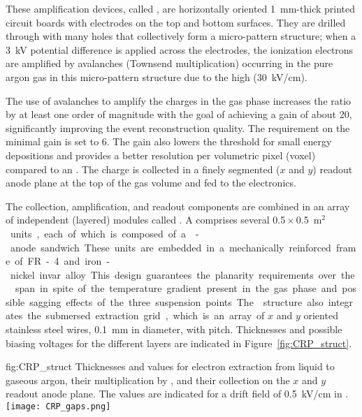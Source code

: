These amplification devices, called , are horizontally  oriented \SI{1}{mm}-thick printed  circuit boards with electrodes on the top and bottom surfaces. They are drilled through with many holes that collectively form a micro-pattern structure;  when a \SI{3}{kV} potential difference is applied across the electrodes, the ionization electrons are amplified by avalanches (Townsend multiplication) occurring in the  pure argon gas in this micro-pattern structure due to the high \efield (\SI{30}{kV/cm}).

The use of avalanches to amplify the charges in the gas phase increases the  ratio by at least one order of magnitude with the goal of achieving a gain of about 20, significantly improving the event reconstruction quality. The requirement on the minimal  gain is set to 6.  The gain also lowers the threshold for small energy depositions and provides a better resolution per volumetric pixel (voxel) compared to an  .  The charge is collected in a finely segmented \twod ($x$ and $y$) readout anode plane at the top of the gas volume and fed to the  electronics.   

The  collection, amplification, and readout components are combined in an array of independent (layered) modules called . A  comprises several \num{0.5}\,$\times$\,\SI{0.5}{m$^2$} units, each of which is composed  of a -anode sandwich.  These units are embedded in a mechanically reinforced frame of FR-4 and iron-nickel invar alloy. This design guarantees the planarity requirements over the  span in spite of the temperature gradient present in the gas phase and possible sagging effects of the three suspension points. The  structure also integrates  the submersed extraction grid, which is an array of $x$ and $y$ oriented stainless steel wires, \SI{0.1}{mm} in diameter, with \dpstrippitch pitch. Thicknesses and possible biasing voltages for the different layers are indicated in Figure~\ref{fig:CRP_struct}.

\begin{dunefigure}{fig:CRP_struct}
{Thicknesses and  values for electron extraction from liquid to gaseous argon, their  multiplication by , and their collection on the $x$ and $y$ readout anode plane. The  values are indicated for a drift field of \SI{0.5}{kV/cm} in .}
\texttt{[image: CRP\_gaps.png]}
\end{dunefigure}

